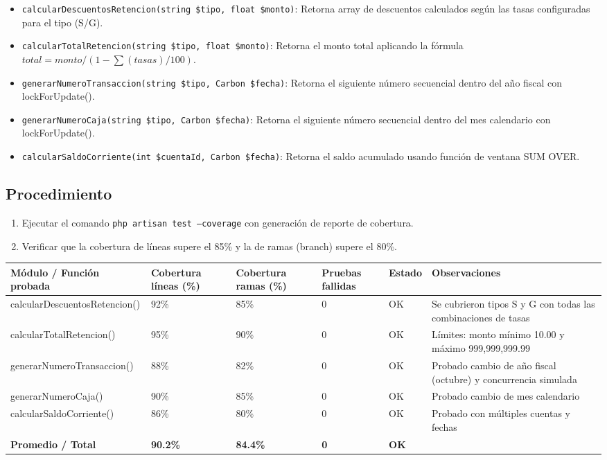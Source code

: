 \documentclass[stu]{apa7}
\begin{document}
\begin{itemize}
    \item \texttt{calcularDescuentosRetencion(string \$tipo, float \$monto)}: Retorna array de descuentos calculados según las tasas configuradas para el tipo (S/G).
    \item \texttt{calcularTotalRetencion(string \$tipo, float \$monto)}: Retorna el monto total aplicando la fórmula $total = monto / (1 - \sum(tasas)/100)$.
    \item \texttt{generarNumeroTransaccion(string \$tipo, Carbon \$fecha)}: Retorna el siguiente número secuencial dentro del año fiscal con lockForUpdate().
    \item \texttt{generarNumeroCaja(string \$tipo, Carbon \$fecha)}: Retorna el siguiente número secuencial dentro del mes calendario con lockForUpdate().
    \item \texttt{calcularSaldoCorriente(int \$cuentaId, Carbon \$fecha)}: Retorna el saldo acumulado usando función de ventana SUM OVER.
\end{itemize}

\subsection{Procedimiento}

\begin{enumerate}
    \item Ejecutar el comando \texttt{php artisan test --coverage} con generación de reporte de cobertura.
    \item Verificar que la cobertura de líneas supere el 85\% y la de ramas (branch) supere el 80\%.
\end{enumerate}

\begin{longtable}{|L{4cm}|C{2cm}|C{2cm}|C{2cm}|C{2cm}|L{4cm}|}
\hline
{}
\textbf{Módulo / Función probada} & \textbf{Cobertura líneas (\%)} & \textbf{Cobertura ramas (\%)} & \textbf{Pruebas fallidas} & \textbf{Estado} & \textbf{Observaciones} \\
\hline
calcularDescuentosRetencion() & 92\% & 85\% & 0 & OK & Se cubrieron tipos S y G con todas las combinaciones de tasas \\
\hline
calcularTotalRetencion() & 95\% & 90\% & 0 & OK & Límites: monto mínimo 10.00 y máximo 999,999,999.99 \\
\hline
generarNumeroTransaccion() & 88\% & 82\% & 0 & OK & Probado cambio de año fiscal (octubre) y concurrencia simulada \\
\hline
generarNumeroCaja() & 90\% & 85\% & 0 & OK & Probado cambio de mes calendario \\
\hline
calcularSaldoCorriente() & 86\% & 80\% & 0 & OK & Probado con múltiples cuentas y fechas \\
\hline
{}
\textbf{Promedio / Total} & \textbf{90.2\%} & \textbf{84.4\%} & \textbf{0} & \textbf{OK} & \\
\hline
\end{longtable}
\end{document}
